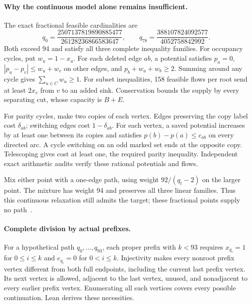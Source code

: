 \documentclass[11pt,a4paper]{article}
\begin{document}
\paragraph{Why the continuous model alone remains insufficient.}
The exact fractional feasible cardinalities are
\[
q_0=\frac{2507137819890885477}{26128236866583647},\qquad
q_{78}=\frac{388107824092577}{4052758842992}.
\]
Both exceed 94 and satisfy all three complete inequality families.
For occupancy cycles, put $w_u=1-x_u$. For each deleted edge $ab$,
a potential satisfies $p_a=0$, $|p_u-p_v|\le w_u+w_v$ on other edges,
and $p_b+w_a+w_b\ge2$. Summing around any cycle gives
$\sum_{u\in C}w_u\ge1$. For subset inequalities, 158 feasible flows
per root send at least $2x_v$ from $v$ to an added sink. Conservation
bounds the supply by every separating cut, whose capacity is $B+E$.

For parity cycles, make two copies of each vertex. Edges preserving
the copy label cost $\delta_{ab}$; switching edges cost $1-\delta_{ab}$.
For each vertex, a saved potential increases by at least one between
its copies and satisfies $p(b)-p(a)\le c_{ab}$ on every directed arc.
A cycle switching on an odd marked set ends at the opposite copy.
Telescoping gives cost at least one, the required parity inequality.
Independent exact arithmetic audits verify these rational potentials and flows.

Mix either point with a one-edge path, using weight $92/(q_t-2)$ on
the larger point. The mixture has weight 94 and preserves all three
linear families. Thus this continuous relaxation still admits the target;
these fractional points supply no path~\cite{research220,research221}.

\paragraph{Complete division by actual prefixes.}
For a hypothetical path $q_0,\ldots,q_{93}$, each proper prefix with
$k<93$ requires $x_{q_i}=1$ for $0\le i\le k$ and $e_{q_i}=0$ for
$0<i\le k$. Injectivity makes every nonroot prefix vertex different
from both full endpoints, including the current last prefix vertex.
Its next vertex is allowed, adjacent to the last vertex, unused, and
nonadjacent to every earlier prefix vertex. Enumerating all such vertices
covers every possible continuation. Lean derives these necessities.
\end{document}
